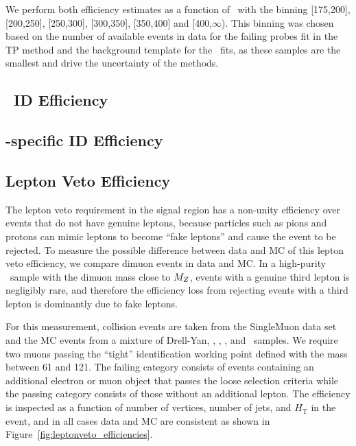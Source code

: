 We perform both efficiency estimates as a function of \pt\ with the binning [175,200], [200,250], [250,300], [300,350], [350,400] and [400,$\infty$). 
This binning was chosen based on the number of available events in data for the failing probes fit in the TP method and the background template for the \sieie\ fits, as these samples are the smallest and drive the uncertainty of the methods.

\subsection{\egamma\ ID Efficiency}
\label{sec:idsf}



\subsection{\Pgg-specific ID Efficiency}
\label{sec:pvsf}



\subsection{Lepton Veto Efficiency}
\label{sec:lepton_veto}

The lepton veto requirement in the signal region has a non-unity efficiency over events that do not have genuine leptons, because particles such as pions and protons can mimic leptons to become ``fake leptons'' and cause the event to be rejected. 
To measure the possible difference between data and MC of this lepton veto efficiency, we compare dimuon events in data and MC. 
In a high-purity \Zmm\  sample with the dimuon mass close to $M_{{Z}}$, events with a genuine third lepton is negligibly rare, and therefore the efficiency loss from rejecting events with a third lepton is dominantly due to fake leptons.

For this measurement, collision events are taken from the SingleMuon data set and the MC events from a mixture of Drell-Yan, \ttbar, \PW\PW, \PW\PZ, and \PZ\PZ\ samples. 
We require two muons passing the ``tight'' identification working point defined  with the mass between 61 and 121\GeV. 
The failing category consists of events containing an additional electron or muon object that passes the loose selection criteria while the passing category consists of those without an additional lepton. 
The efficiency is inspected as a function of number of vertices, number of jets, and $H_{\mathrm{T}}$ in the event, and in all cases data and MC are consistent as shown in Figure~\ref{fig:leptonveto_efficiencies}.

